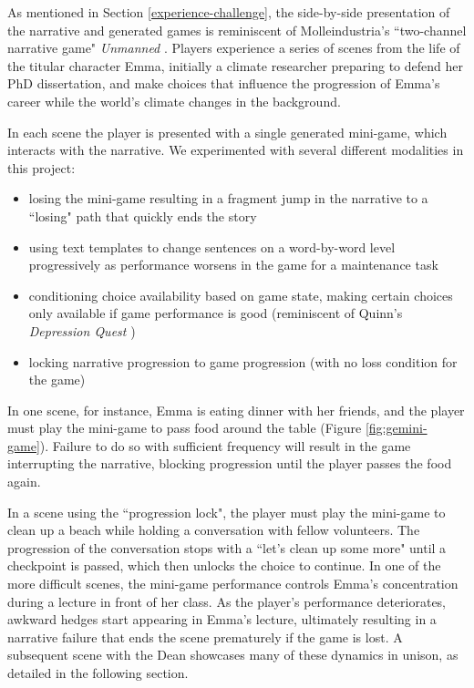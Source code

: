 As mentioned in Section \ref{experience-challenge}, the side-by-side presentation of the narrative and generated games is reminiscent of Molleindustria’s ``two-channel narrative game" \textit{Unmanned} \cite{Unmanned}. Players experience a series of scenes from the life of the titular character Emma, initially a climate researcher preparing to defend her PhD dissertation, and make choices that influence the progression of Emma’s career while the world’s climate changes in the background. 

In each scene the player is presented with a single generated mini-game, which interacts with the narrative. We experimented with several different modalities in this project: 

\begin{itemize}
    \item losing the mini-game resulting in a fragment jump in the narrative to a ``losing" path that quickly ends the story
    \item using text templates to change sentences on a word-by-word level progressively as performance worsens in the game for a maintenance task
    \item conditioning choice availability based on game state, making certain choices only available if game performance is good (reminiscent of Quinn’s \textit{Depression Quest} \cite{DepressionQuest})
    \item locking narrative progression to game progression (with no loss condition for the game)
\end{itemize}

In one scene, for instance, Emma is eating dinner with her friends, and the player must play the mini-game to pass food around the table (Figure \ref{fig:gemini-game}). Failure to do so with sufficient frequency will result in the game interrupting the narrative, blocking progression until the player passes the food again. 

In a scene using the ``progression lock", the player must play the mini-game to clean up a beach while holding a conversation with fellow volunteers. The progression of the conversation stops with a ``let's clean up some more" until a checkpoint is passed, which then unlocks the choice to continue. In one of the more difficult scenes, the mini-game performance controls Emma’s concentration during a lecture in front of her class. As the player's performance deteriorates, awkward hedges start appearing in Emma's lecture, ultimately resulting in a narrative failure that ends the scene prematurely if the game is lost. A subsequent scene with the Dean showcases many of these dynamics in unison, as detailed in the following section.

